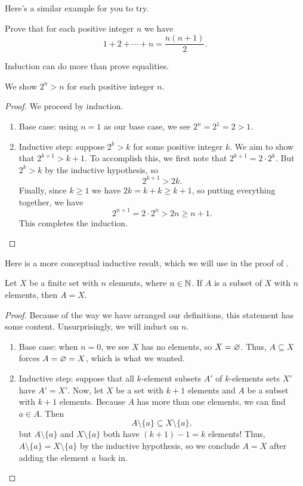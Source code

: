 \documentclass[../notes.tex]{subfiles}
\begin{document}
Here's a similar example for you to try.
\begin{exercise}
    Prove that for each positive integer $n$ we have
    \[1+2+\cdots+n = \frac{n(n + 1)}{2}.\]
\end{exercise}
Induction can do more than prove equalities.
\begin{example}
    We show $2^n > n$ for each positive integer $n$.
\end{example}
\begin{proof}
    We proceed by induction.
    \begin{enumerate}
        \item Base case: using $n=1$ as our base case, we see $2^n = 2^1 = 2>1$.
        \item Inductive step: suppose $2^k > k$ for some positive integer $k$. We aim to show that $2^{k + 1} > k + 1$. To accomplish this, we first note that $2^{k + 1} = 2 \cdot 2^k$. But $2^k > k$ by the inductive hypothesis, so
        \[2^{k + 1} > 2k.\]
        Finally, since $k \geq 1$ we have $2k = k + k \geq k + 1$, so putting everything together, we have
        \[2^{n + 1} = 2 \cdot 2^n > 2n \geq n + 1.\]
        This completes the induction.
        \qedhere
    \end{enumerate}
\end{proof}
Here is a more conceptual inductive result, which we will use in the proof of .
\begin{prop} \label{prop:dedekind-finite}
    Let $X$ be a finite set with $n$ elements, where $n\in\mathbb N$. If $A$ is a subset of $X$ with $n$ elements, then $A=X$.
\end{prop}
\begin{proof}
    Because of the way we have arranged our definitions, this statement has some content. Unsurprisingly, we will induct on $n$.
    \begin{enumerate}
        \item Base case: when $n=0$, we see $X$ has no elements, so $X=\varnothing$. Thus, $A\subseteq X$ forces $A=\varnothing=X$, which is what we wanted.
        \item Inductive step: suppose that all $k$-element subsets $A'$ of $k$-elements sets $X'$ have $A'=X'$. Now, let $X$ be a set with $k+1$ elements and $A$ be a subset with $k+1$ elements. Because $A$ has more than one elements, we can find $a\in A$. Then
        \[A\setminus\{a\}\subseteq X\setminus\{a\},\]
        but $A\setminus\{a\}$ and $X\setminus\{a\}$ both have $(k+1)-1=k$ elements! Thus, $A\setminus\{a\}=X\setminus\{a\}$ by the inductive hypothesis, so we conclude $A=X$ after adding the element $a$ back in.
        \qedhere
    \end{enumerate}
\end{proof}
\end{document}
